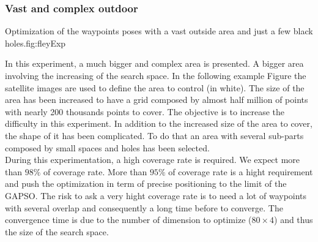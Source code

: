 		\subsubsection{Vast and complex outdoor}\label{sec:fey_map}

\begin{mfigures}[!]{Optimization of the waypoints poses with a vast outside area and just a few  black holes.}{fig:fleyExp} \centering
{}
\hspace{1cm}
\hspace{1cm}
\tabsimuposeFley
\end{mfigures}


In this experiment, a much bigger and complex area is presented.
	A bigger area involving the increasing of the search space. 
In the following example Figure  the satellite images are used to define the area to control (in white). The size of the area has been increased to have a grid composed by almost half million of points with nearly 200 thousands points to cover. 
The objective is to increase the difficulty in this experiment. In addition to the increased size of the area to cover, the shape of it has been complicated. To do that an area with several sub-parts composed by small spaces and holes has been selected.\\
During this experimentation, a high coverage rate is required. We expect more than $98\%$ of coverage rate. More than $95\%$ of coverage rate is a hight requirement and push the optimization in term of precise positioning to the limit of the GAPSO. The risk to ask a very hight coverage rate is to need a lot of waypoints with several overlap and consequently a long time before to converge.  The convergence time is due to the number of dimension to optimize  ($80\times 4 $) and  thus the size of the search space.

